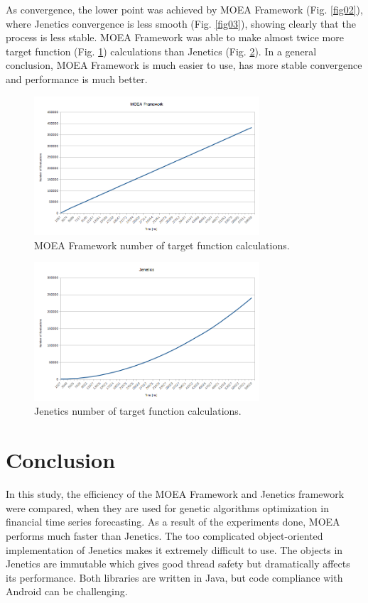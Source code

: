 \documentclass[conference]{IEEEtran}
\begin{document}
As convergence, the lower point was achieved by MOEA Framework (Fig. \ref{fig02}), where Jenetics convergence is less smooth (Fig. \ref{fig03}), showing clearly that the process is less stable. MOEA Framework was able to make almost twice more target function (Fig. \ref{fig04}) calculations than Jenetics (Fig. \ref{fig05}). In a general conclusion, MOEA Framework is much easier to use, has more stable convergence and performance is much better.

\begin{figure}[htbp]
\centerline{\includegraphics[width=8.4cm]{fig04.png}}
\caption{MOEA Framework number of target function calculations.}
\label{fig04}
\end{figure}

\begin{figure}[htbp]
\centerline{\includegraphics[width=8.4cm]{fig05.png}}
\caption{Jenetics number of target function calculations.}
\label{fig05}
\end{figure}

\section{Conclusion}

In this study, the efficiency of the MOEA Framework and Jenetics framework were compared, when they are used for genetic algorithms optimization in financial time series forecasting. As a result of the experiments done, MOEA performs much faster than Jenetics. The too complicated object-oriented implementation of Jenetics makes it extremely difficult to use. The objects in Jenetics are immutable which gives good thread safety but dramatically affects its performance. Both libraries are written in Java, but code compliance with Android can be challenging. 
\end{document}
